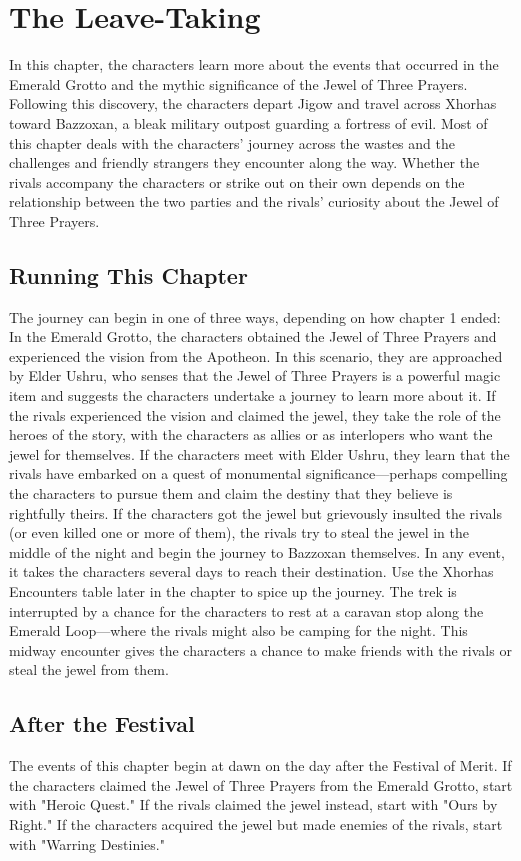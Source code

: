 \documentclass[10pt,a4,twoside,twocolumn,openany,nodeprecatedcode]{dndbook}
\begin{document}
\chapter{The Leave-Taking}
In this chapter, the characters learn more about the events that occurred in the Emerald Grotto and the mythic significance of the Jewel of Three Prayers. Following this discovery, the characters depart Jigow and travel across Xhorhas toward Bazzoxan, a bleak military outpost guarding a fortress of evil.
Most of this chapter deals with the characters' journey across the wastes and the challenges and friendly strangers they encounter along the way. Whether the rivals accompany the characters or strike out on their own depends on the relationship between the two parties and the rivals' curiosity about the Jewel of Three Prayers.
\section{Running This Chapter}
The journey can begin in one of three ways, depending on how chapter 1 ended:
{{In the Emerald Grotto, the characters obtained the Jewel of Three Prayers and experienced the vision from the Apotheon. In this scenario, they are approached by Elder Ushru, who senses that the Jewel of Three Prayers is a powerful magic item and suggests the characters undertake a journey to learn more about it.}}
{{If the rivals experienced the vision and claimed the jewel, they take the role of the heroes of the story, with the characters as allies or as interlopers who want the jewel for themselves. If the characters meet with Elder Ushru, they learn that the rivals have embarked on a quest of monumental significance—perhaps compelling the characters to pursue them and claim the destiny that they believe is rightfully theirs.}}
{{If the characters got the jewel but grievously insulted the rivals (or even killed one or more of them), the rivals try to steal the jewel in the middle of the night and begin the journey to Bazzoxan themselves.}}
In any event, it takes the characters several days to reach their destination. Use the Xhorhas Encounters table later in the chapter to spice up the journey.
The trek is interrupted by a chance for the characters to rest at a caravan stop along the Emerald Loop—where the rivals might also be camping for the night. This midway encounter gives the characters a chance to make friends with the rivals or steal the jewel from them.
\section{After the Festival}
The events of this chapter begin at dawn on the day after the Festival of Merit. If the characters claimed the Jewel of Three Prayers from the Emerald Grotto, start with "Heroic Quest." If the rivals claimed the jewel instead, start with "Ours by Right." If the characters acquired the jewel but made enemies of the rivals, start with "Warring Destinies."
\end{document}
